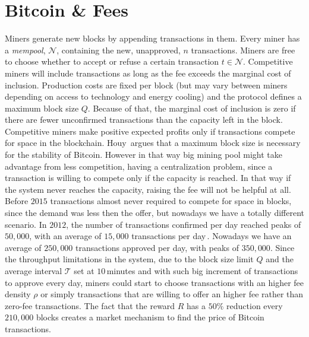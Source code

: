 \documentclass[USenglish]{uit-thesis}
\begin{document}
\section{Bitcoin \& Fees}
\label{sec:bitcoinfee}
Miners generate new blocks by appending
transactions in them. Every miner has a \emph{mempool}, $\mathcal{N}$,
containing the new, unapproved, $n$ transactions.
Miners are free to choose
whether to accept or refuse a certain transaction $t \in \mathcal{N}$.
Competitive miners will include transactions as long as the fee exceeds
the marginal cost of inclusion. Production costs are fixed
per block (but may vary between miners depending on access to
technology and energy cooling) and the protocol
defines a maximum block size $Q$.
Because of that, the marginal cost of inclusion is zero if there are
fewer unconfirmed transactions than the capacity left in the block.
Competitive miners make positive expected profits only if transactions
compete for space in the blockchain. Houy\,\cite{houy2014EOBTF}
argues that a maximum block size is necessary for the stability of Bitcoin.
However in that way big mining pool might take advantage from less competition,
having a centralization problem, since a transaction is willing to
compete only if the capacity is reached.
In that way if the system never reaches the capacity, raising the fee
will not be helpful at all. Before $2015$ transactions almost
never required to compete for space in blocks, since the demand
was less then the offer, but nowadays we have a totally different
scenario. 
In $2012$, the number of transactions confirmed per day
reached peaks of $50,000$, with an average of
$15,000$ transactions per day\,\cite{bitcoin_blockchain}.
Nowadays we have an average of $250,000$ transactions
approved per day, with peaks of $350,000$. Since the throughput
limitations in the system, due to the block size limit $Q$
and the average interval $\mathcal{T}$ set at $10$\,minutes and
with such big increment of transactions to approve every day,
miners could start to choose transactions with an higher
fee density $\rho$ or simply transactions
that are willing to offer an higher fee
rather than zero-fee transactions.
The fact that the reward $R$ has a $50\%$ reduction every
$210,000$ blocks creates a market mechanism to find the price
of Bitcoin transactions.
\end{document}
